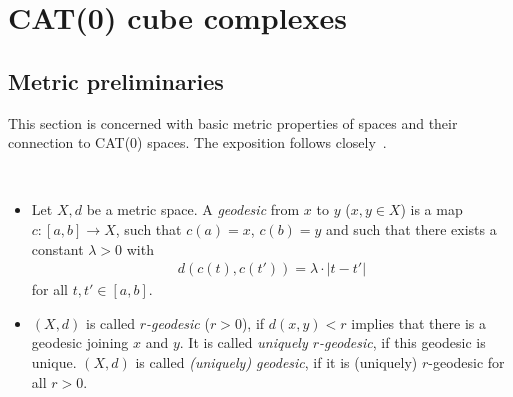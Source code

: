 \section{CAT(0) cube complexes}
\label{sec:complexes}

\subsection{Metric preliminaries}
\label{sec:metric}
This section is concerned with basic metric properties of spaces and their connection to CAT(\(0\)) spaces. The exposition follows closely~\cite{MR1744486}.

\begin{defin}~
  \begin{itemize}
  \item Let \(X, d\) be a metric space. A \emph{geodesic} from \(x\) to \(y\) (\(x,y \in X\)) is a map \(c\colon [a,b] \to X\), such that \(c(a) = x\), \(c(b) = y\) and such that there exists a constant \(\lambda > 0\) with
    \begin{align*}
      d(c(t), c(t')) = \lambda \cdot |t - t'| 
    \end{align*}
    for all \(t,t' \in [a,b]\).
  \item \((X,d)\) is called \emph{\(r\)-geodesic} (\(r > 0\)), if \(d(x,y) < r\) implies that there is a geodesic joining \(x\) and \(y\). It is called \emph{uniquely \(r\)-geodesic}, if this geodesic is unique. \((X,d)\) is called \emph{(uniquely) geodesic}, if it is (uniquely) \(r\)-geodesic for all \(r > 0\).
  \end{itemize}
\end{defin}

